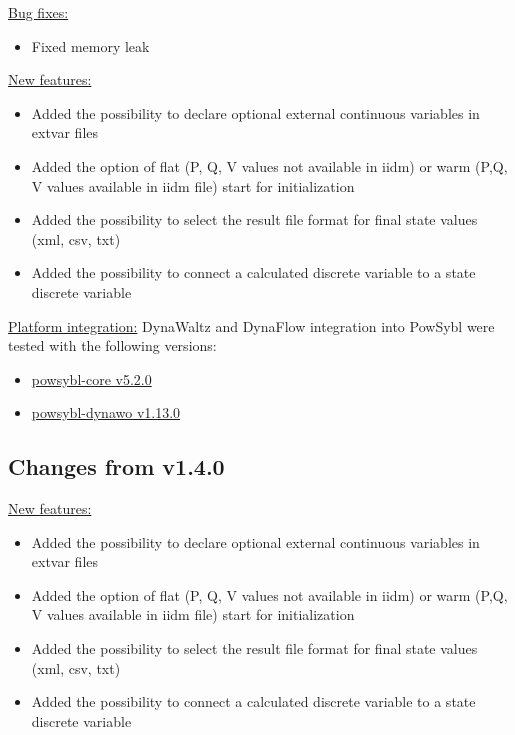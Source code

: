 \documentclass[a4paper, 12pt]{report}
\begin{document}
\underline{Bug fixes:}

\begin{itemize}
\item Fixed memory leak
\end{itemize}

\underline{New features:}
\begin{itemize}
\item Added the possibility to declare optional external continuous variables in extvar files
\item Added the option of flat (P, Q, V values not available in iidm) or warm (P,Q, V values available in iidm file) start for initialization
\item Added the possibility to select the result file format for final state values (xml, csv, txt)
\item Added the possibility to connect a calculated discrete variable to a state discrete variable
\end{itemize}

\underline{Platform integration:}
DynaWaltz and DynaFlow integration into PowSybl were tested with the following versions:
\begin{itemize}
\item \href{https://github.com/powsybl/powsybl-core/releases/tag/v5.2.0}{powsybl-core v5.2.0}
\item \href{https://github.com/powsybl/powsybl-dynawo/releases/tag/v1.13.0}{powsybl-dynawo v1.13.0}
\end{itemize}


\subsection{Changes from v1.4.0}

\underline{New features:}
\begin{itemize}
\item Added the possibility to declare optional external continuous variables in extvar files
\item Added the option of flat (P, Q, V values not available in iidm) or warm (P,Q, V values available in iidm file) start for initialization
\item Added the possibility to select the result file format for final state values (xml, csv, txt)
\item Added the possibility to connect a calculated discrete variable to a state discrete variable
\end{itemize}
\end{document}
